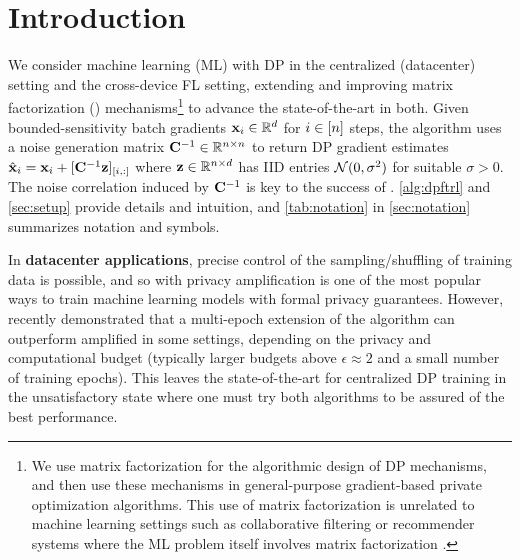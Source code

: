 \documentclass{article}
\begin{document}
\section{Introduction}
We consider machine learning (ML) with DP in the centralized (datacenter) setting and the cross-device FL setting, extending and improving matrix factorization (\MF) mechanisms\footnote{
We use matrix factorization for the algorithmic design of DP mechanisms, and then use these mechanisms in general-purpose gradient-based private optimization algorithms. This use of matrix factorization is unrelated to machine learning settings such as collaborative filtering or recommender systems where the ML problem itself involves matrix factorization \citep{koren09recommender,hyejin18privmf,zitao21fedmf}.} to advance the state-of-the-art in both. Given bounded-sensitivity batch gradients $\mathbf{x}_i \in \mathbb{R}^d$ for $i \in [n]$ steps, the \mfftrl algorithm uses a noise generation matrix $\mathbf{C}^{-1} \in \mathbb{R}^{n \times n}$ to return DP gradient estimates $\hat{\mathbf{x}}_i = \mathbf{x}_i + [\mathbf{C}^{-1} \mathbf{z}]_{[i, :]}$ where $\mathbf{z} \in \mathbb{R}^{{n \times d}}$ has IID entries $\mathcal{N}(0, \sigma^2)$ for suitable $\sigma > 0$. The noise correlation induced by $\mathbf{C}^{-1}$ is key to the success of \mfftrl. \cref{alg:dpftrl} and \cref{sec:setup} provide details and intuition, and \cref{tab:notation} in \cref{sec:notation} summarizes notation and symbols.

In \textbf{datacenter applications}, precise control of the sampling/shuffling of training data is possible, and so \DPSGD with privacy amplification \citep{DP-DL} is one of the most popular ways to train machine learning models with formal privacy guarantees. However, \citet{choquette2022multi} recently demonstrated that a multi-epoch extension of the \MFFTRL algorithm can outperform amplified \DPSGD in some settings, depending on the privacy and computational budget (typically larger budgets above $\epsilon\approx2$ and a small number of training epochs). %
This leaves the state-of-the-art for centralized DP training in the unsatisfactory state where one must try both algorithms to be assured of the best performance.
\end{document}

